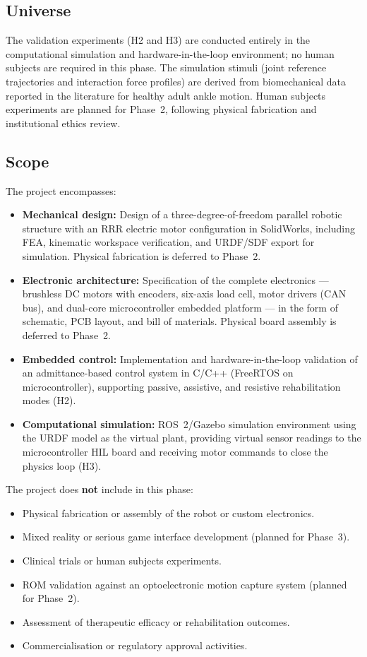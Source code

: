 \subsection*{Universe}

The validation experiments (H2 and H3) are conducted entirely in the computational simulation and hardware-in-the-loop environment; no human subjects are required in this phase.
The simulation stimuli (joint reference trajectories and interaction force profiles) are derived from biomechanical data reported in the literature for healthy adult ankle motion.
Human subjects experiments are planned for Phase~2, following physical fabrication and institutional ethics review.

\subsection*{Scope}

The project encompasses:
\begin{itemize}
    \item \textbf{Mechanical design:} Design of a three-degree-of-freedom parallel robotic structure with an RRR electric motor configuration in SolidWorks, including FEA, kinematic workspace verification, and URDF/SDF export for simulation. Physical fabrication is deferred to Phase~2.
    \item \textbf{Electronic architecture:} Specification of the complete electronics — brushless DC motors with encoders, six-axis load cell, motor drivers (CAN bus), and dual-core microcontroller embedded platform — in the form of schematic, PCB layout, and bill of materials. Physical board assembly is deferred to Phase~2.
    \item \textbf{Embedded control:} Implementation and hardware-in-the-loop validation of an admittance-based control system in C/C++ (FreeRTOS on microcontroller), supporting passive, assistive, and resistive rehabilitation modes (H2).
    \item \textbf{Computational simulation:} ROS~2/Gazebo simulation environment using the URDF model as the virtual plant, providing virtual sensor readings to the microcontroller HIL board and receiving motor commands to close the physics loop (H3).
\end{itemize}

The project does \textbf{not} include in this phase:
\begin{itemize}
    \item Physical fabrication or assembly of the robot or custom electronics.
    \item Mixed reality or serious game interface development (planned for Phase~3).
    \item Clinical trials or human subjects experiments.
    \item ROM validation against an optoelectronic motion capture system (planned for Phase~2).
    \item Assessment of therapeutic efficacy or rehabilitation outcomes.
    \item Commercialisation or regulatory approval activities.
\end{itemize}

